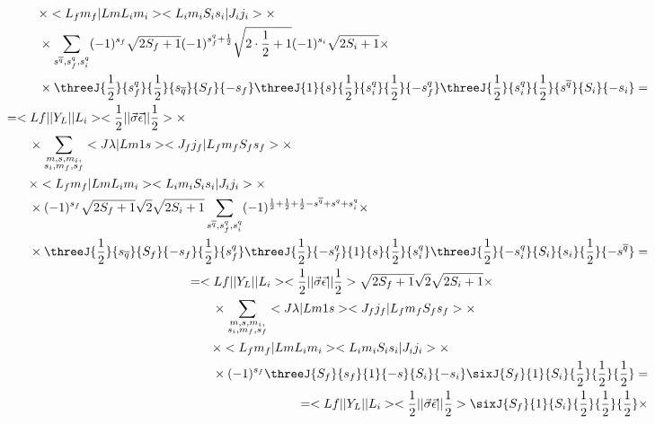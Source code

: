 \begin{align}
\begin{split}
        &\qquad\times <L_f m_f| L m L_i m_i> <L_i m_i S_i s_i| J_i j_i> \times \\
        &\qquad\times \sum_{s^{\overline{q}}, s_{f}^{q}, s_i^q} (-1)^{s_f}\sqrt{2S_f+1} (-1)^{s_f^q + \frac{1}{2}}\sqrt{2 \cdot \frac{1}{2} + 1} (-1)^{s_i} \sqrt{2S_i + 1} \times \\
        &\qquad\times \threeJ{\frac{1}{2}}{s_f^q}{\frac{1}{2}}{s_{\overline{q}}}{S_f}{-s_f} \threeJ{1}{s}{\frac{1}{2}}{s_i^q}{\frac{1}{2}}{-s_f^q} \threeJ{\frac{1}{2}}{s_i^q}{\frac{1}{2}}{s^{\overline{q}}}{S_i}{-s_i}  =
    \end{split}\\
    \begin{split}
        &= <Lf|| Y_L ||L_i> <\frac{1}{2}|| \vec{\sigma}\vec{\epsilon} ||\frac{1}{2}> \times \\
        &\qquad\times \sum_{\substack{m, s, m_i,\\ s_i, m_f, s_f}} <J \lambda| L m 1 s> <J_f j_f| L_f m_f S_f s_f> \times \\
        &\qquad\times <L_f m_f| L m L_i m_i> <L_i m_i S_i s_i| J_i j_i> \times \\
        &\qquad\times (-1)^{s_f}\sqrt{2S_f+1} \sqrt{2} \sqrt{2S_i + 1} \sum_{s^{\overline{q}}, s_{f}^{q}, s_i^q} (-1)^{\frac{1}{2} + \frac{1}{2} + \frac{1}{2} - s^{\overline{q}} + s^q + s_i^q} \times \\
        &\qquad\times \threeJ{\frac{1}{2}}{s_{\overline{q}}}{S_f}{-s_f}{\frac{1}{2}}{s_f^q} \threeJ{\frac{1}{2}}{-s_f^q}{1}{s}{\frac{1}{2}}{s_i^q} \threeJ{\frac{1}{2}}{-s_i^q}{S_i}{s_i}{\frac{1}{2}}{-s^{\overline{q}}}  =
    \end{split}\\
    \begin{split}
        &= <Lf|| Y_L ||L_i> <\frac{1}{2}|| \vec{\sigma}\vec{\epsilon} ||\frac{1}{2}> \sqrt{2S_f+1} \sqrt{2} \sqrt{2S_i + 1} \times \\
        &\qquad\times \sum_{\substack{m, s, m_i,\\ s_i, m_f, s_f}} <J \lambda| L m 1 s> <J_f j_f| L_f m_f S_f s_f> \times \\
        &\qquad\times <L_f m_f| L m L_i m_i> <L_i m_i S_i s_i| J_i j_i> \times \\
        &\qquad\times (-1)^{s_f} \threeJ{S_f}{s_f}{1}{-s}{S_i}{-s_i} \sixJ{S_f}{1}{S_i}{\frac{1}{2}}{\frac{1}{2}}{\frac{1}{2}} =
    \end{split}\\
    \begin{split}
        &= <Lf|| Y_L ||L_i> <\frac{1}{2}|| \vec{\sigma}\vec{\epsilon} ||\frac{1}{2}> \sixJ{S_f}{1}{S_i}{\frac{1}{2}}{\frac{1}{2}}{\frac{1}{2}} \times \\

\end{split}
\end{align}
